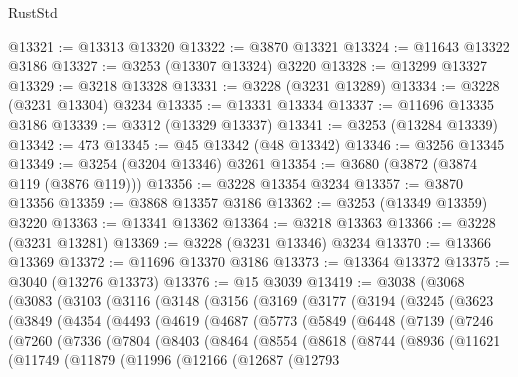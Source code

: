 \begin{lexlean}{RustStd}
\begin{coremodule}
@13321 := @13313 @13320
@13322 := @3870 @13321
@13324 := @11643 @13322 @3186
@13327 := @3253 (@13307 @13324) @3220
@13328 := @13299 @13327
@13329 := @3218 @13328
@13331 := @3228 (@3231 @13289)
@13334 := @3228 (@3231 @13304) @3234
@13335 := @13331 @13334
@13337 := @11696 @13335 @3186
@13339 := @3312 (@13329 @13337)
@13341 := @3253 (@13284 @13339)
@13342 := 473
@13345 := @45 @13342 (@48 @13342)
@13346 := @3256 @13345
@13349 := @3254 (@3204 @13346) @3261
@13354 := @3680 (@3872 (@3874 @119 (@3876 @119)))
@13356 := @3228 @13354 @3234
@13357 := @3870 @13356
@13359 := @3868 @13357 @3186
@13362 := @3253 (@13349 @13359) @3220
@13363 := @13341 @13362
@13364 := @3218 @13363
@13366 := @3228 (@3231 @13281)
@13369 := @3228 (@3231 @13346) @3234
@13370 := @13366 @13369
@13372 := @11696 @13370 @3186
@13373 := @13364 @13372
@13375 := @3040 (@13276 @13373)
@13376 := @15 @3039
@13419 := @3038
    (@3068
      (@3083
        (@3103
          (@3116
            (@3148
              (@3156
                (@3169
                  (@3177
                    (@3194
                      (@3245
                        (@3623
                          (@3849
                            (@4354
                              (@4493
                                (@4619
                                  (@4687
                                    (@5773
                                      (@5849
                                        (@6448
                                          (@7139
                                            (@7246
                                              (@7260
                                                (@7336
                                                  (@7804
                                                    (@8403
                                                      (@8464
                                                        (@8554
                                                          (@8618
                                                            (@8744
                                                              (@8936
                                                                (@11621
                                                                  (@11749
                                                                    (@11879
                                                                      (@11996
                                                                        (@12166
                                                                          (@12687
                                                                            (@12793

\end{coremodule}
\end{lexlean}
